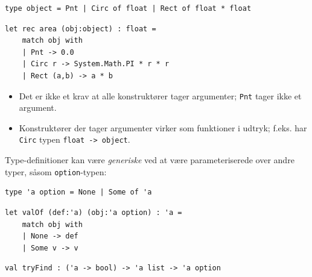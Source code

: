 \documentclass[rgb]{beamer}
\begin{document}
\begin{frame}[fragile]
\begin{footnotesize}


\begin{lstlisting}[numbers=none,frame=none,mathescape]
  type object = Pnt | Circ of float | Rect of float * float
\end{lstlisting}

  \vspace{1ex}
\begin{lstlisting}[numbers=none,frame=none,mathescape]
  let rec area (obj:object) : float =
    match obj with
    | Pnt -> 0.0
    | Circ r -> System.Math.PI * r * r
    | Rect (a,b) -> a * b
\end{lstlisting}

  \vspace{1ex}

\begin{itemize}
\item Det er ikke et krav at alle konstruktører tager argumenter; \lstinline{Pnt} tager ikke et argument.
\item Konstruktører der tager argumenter virker som funktioner i udtryk; f.eks. har \lstinline{Circ} typen \lstinline{float -> object}.
\end{itemize}

\end{footnotesize}
\end{frame}

\begin{frame}[fragile]
\begin{footnotesize}


  Type-definitioner kan være \emph{generiske} ved at være
  parameteriserede over andre typer, såsom \lstinline{option}-typen:

\begin{lstlisting}[numbers=none,frame=none,mathescape]
  type 'a option = None | Some of 'a
\end{lstlisting}

  \vspace{1ex}
\begin{lstlisting}[numbers=none,frame=none,mathescape]
  let valOf (def:'a) (obj:'a option) : 'a =
    match obj with
    | None -> def
    | Some v -> v
\end{lstlisting}


\begin{lstlisting}[numbers=none,frame=none,mathescape]
  val tryFind : ('a -> bool) -> 'a list -> 'a option
\end{lstlisting}

\end{footnotesize}
\end{frame}
\end{document}
